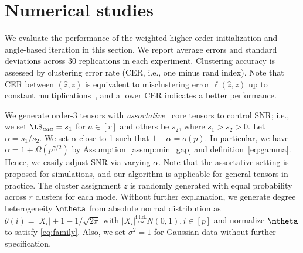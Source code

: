 \documentclass[lettersize,onecolumn,journal]{IEEEtran}
\theoremstyle{definition}
\theoremstyle{definition}
\def\fixme#1#2{\textbf{\color{red}[FIXME (#1): #2]}}
\providecommand{\DIFaddtex}[1]{{\protect\color{blue}\uwave{#1}}} %
\providecommand{\DIFdeltex}[1]{{\protect\color{red}\sout{#1}}}                      %
\providecommand{\DIFaddbegin}{} %
\providecommand{\DIFaddend}{} %
\providecommand{\DIFdelbegin}{} %
\providecommand{\DIFdelend}{} %
\providecommand{\DIFadd}[1]{\texorpdfstring{\DIFaddtex{#1}}{#1}} %
\providecommand{\DIFdel}[1]{\texorpdfstring{\DIFdeltex{#1}}{}} %
\newcommand{\DIFscaledelfig}{0.5}
\newlength{\DIFdelgraphicswidth} %
\newlength{\DIFdelgraphicsheight} %
\newcommand{\DIFaddincludegraphics}[2][]{{\color{blue}\fbox{\DIFOincludegraphics[#1]{#2}}}} %
\newcommand{\DIFdelincludegraphics}[2][]{%
\sbox{\DIFdelgraphicsbox}{\DIFOincludegraphics[#1]{#2}}%
\settoboxwidth{\DIFdelgraphicswidth}{\DIFdelgraphicsbox} %
\settoboxtotalheight{\DIFdelgraphicsheight}{\DIFdelgraphicsbox} %
\scalebox{\DIFscaledelfig}{%
\parbox[b]{\DIFdelgraphicswidth}{\usebox{\DIFdelgraphicsbox}\\[-\baselineskip] \rule{\DIFdelgraphicswidth}{0em}}\llap{\resizebox{\DIFdelgraphicswidth}{\DIFdelgraphicsheight}{%
\setlength{\unitlength}{\DIFdelgraphicswidth}%
\begin{picture}(1,1)%
\thicklines\linethickness{2pt} %
{\color[rgb]{1,0,0}\put(0,0){\framebox(1,1){}}}%
{\color[rgb]{1,0,0}\put(0,0){\line( 1,1){1}}}%
{\color[rgb]{1,0,0}\put(0,1){\line(1,-1){1}}}%
\end{picture}%
}\hspace*{3pt}}} %
} %
\DeclareRobustCommand{\DIFaddbegin}{\DIFOaddbegin \let\includegraphics\DIFaddincludegraphics} %
\DeclareRobustCommand{\DIFaddend}{\DIFOaddend \let\includegraphics\DIFOincludegraphics} %
\DeclareRobustCommand{\DIFdelbegin}{\DIFOdelbegin \let\includegraphics\DIFdelincludegraphics} %
\DeclareRobustCommand{\DIFdelend}{\DIFOaddend \let\includegraphics\DIFOincludegraphics} %
\begin{document}




\DIFdelend \section{Numerical studies}\label{sec:simulation}

 We evaluate the performance of the weighted higher-order initialization and angle-based iteration in this section. We report average errors and standard deviations across 30 replications in each experiment. Clustering accuracy is assessed by clustering error rate (CER, i.e., one minus rand index). Note that CER between $(\hat z, z)$ is equivalent to misclustering error $\ell(\hat z, z)$ up to constant multiplications~\citep{meilua2012local}, and a lower CER indicates a better performance.

We generate order-3 tensors with \emph{assortative}~\citep{gao2018community} core tensors to control SNR; i.e., we set $\tS_{aaa} = s_1$ for $a \in [r]$ and others be $s_2$, where $s_1 > s_2 > 0$. Let $\alpha = s_1/s_2$. We set $\alpha$ close to 1 such that $1-\alpha=o(p)$. In particular, we have $\alpha = 1 + \Omega(p^{\gamma/2})$ %
  \DIFaddbegin \DIFadd{with $\gamma<0$ }\DIFaddend by Assumption~\ref{assmp:min_gap} and definition~\eqref{eq:gamma}. Hence, we easily adjust SNR via varying $\alpha$. %
 Note that the assortative setting is proposed for simulations, and our algorithm is applicable for general tensors in practice. The cluster assignment $z$ is randomly generated with equal probability across  $r$ clusters for each mode. Without further explanation, we generate degree heterogeneity $\mtheta$ from absolute normal distribution \DIFdelbegin \DIFdel{as }\DIFdelend \DIFaddbegin \DIFadd{by }\DIFaddend $\theta(i) = |X_i| + 1 - 1/\sqrt{2\pi}$ with $|X_i| \stackrel{\text{i.i.d.}}\sim N(0,1), i \in [p]$ and normalize $\mtheta$ to satisfy \eqref{eq:family}. Also, we set $\sigma^2 = 1$ for Gaussian data without further specification. 
\end{document}
